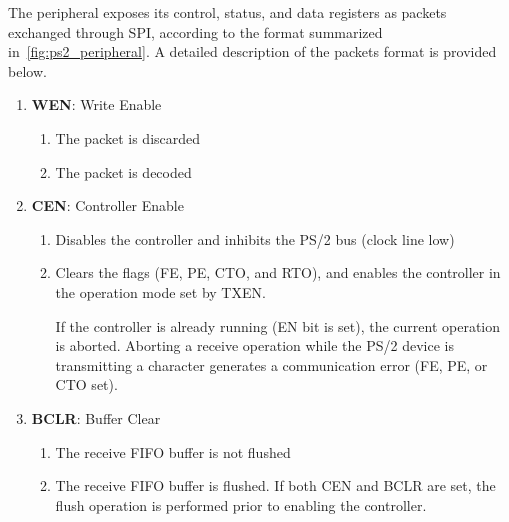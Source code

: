 \documentclass[]{article}
\begin{document}
The peripheral exposes its control, status, and data registers as packets exchanged through SPI, according to the format summarized in~\cref{fig:ps2_peripheral}. A detailed description of the packets format is provided below.
\begin{description}[style=nextline]
    \item[MOSI Packet]\hfill
    
        \begin{enumerate}[
            label=\emph{Bit \arabic*}, widest=s 15:8,
            left=\parindent, align=left,
            itemsep=2.5\itemsep,
            start=0
        ]
        \item \textbf{WEN}: Write Enable
        \begin{enumerate}[label=\arabic*:, start=0]
            \item The packet is discarded
            \item The packet is decoded
        \end{enumerate}
    
        \item \textbf{CEN}: Controller Enable
        \begin{enumerate}[label=\arabic*:, start=0]
            \item Disables the controller and inhibits the PS/2 bus (clock line low)
            \item Clears the flags (FE, PE, CTO, and RTO), and enables the controller in the operation mode set by TXEN.
            
            If the controller is already running (EN bit is set), the current operation is aborted. Aborting a receive operation while the PS/2 device is transmitting a character generates a communication error (FE, PE, or CTO set).
        \end{enumerate}
    
        \item \textbf{BCLR}: Buffer Clear
        \begin{enumerate}[label=\arabic*:, start=0]
            \item The receive FIFO buffer is not flushed
            \item The receive FIFO buffer is flushed. If both CEN and BCLR are set, the flush operation is performed prior to enabling the controller.
        \end{enumerate}
    
        \makeatletter
            \addtocounter{\@enumctr}{4}
        \makeatother
        

\end{enumerate}
\end{description}
\end{document}
